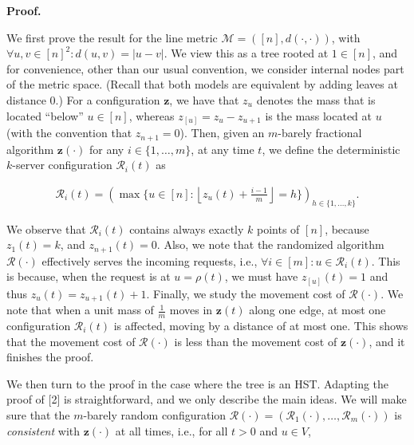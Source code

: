 



\par\medskip\noindent\textbf{Proof.}\par




We first prove the result for the line metric $\mathcal{M}=([n],d(\cdot,\cdot))$, with $\forall u,v\in[n]^{2}\colon d(u,v)=|u-v|$.
We view this as a tree rooted at $1\in[n]$, and for convenience, other than our usual convention, we consider internal nodes part of the metric space. (Recall that both models are equivalent by adding leaves at distance $0$.)
For a configuration ${\mathbf{z}}$, we have that $z_{u}$ denotes the mass that is located “below” $u\in[n]$, whereas $z_{[u]}=z_{u}-z_{u+1}$ is the mass located at $u$ (with the convention that $z_{n+1}=0$). Then, given an $m$-barely fractional algorithm ${\mathbf{z}}(\cdot)$ for any $i\in\{1,\dots,m\}$, at any time $t$, we define the deterministic $k$-server configuration $\mathcal{R}_{i}(t)$ as\par


\[\begin{gathered}
\mathcal{R}_{i}(t)=\left(\max\{u\in[n]\colon\left\lfloor z_{u}(t)+\frac{i-1}{m}\right\rfloor=h\}\right)_{h\in\{1,\dots,k\}}.
\end{gathered}\]


We observe that $\mathcal{R}_{i}(t)$ contains always exactly $k$ points of $[n]$, because $z_{1}(t)=k$, and $z_{n+1}(t)=0$. Also, we note that the randomized algorithm $\mathcal{R}(\cdot)$ effectively serves the incoming requests, i.e., $\forall i\in[m]\colon u\in\mathcal{R}_{i}(t)$. This is because, when the request is at $u=\rho(t)$, we must have $z_{[u]}(t)=1$ and thus $z_{u}(t)=z_{u+1}(t)+1$. Finally, we study the movement cost of $\mathcal{R}(\cdot)$. We note that when a unit mass of $\frac{1}{m}$ moves in ${\mathbf{z}}(t)$ along one edge, at most one configuration $\mathcal{R}_{i}(t)$ is affected, moving by a distance of at most one. This shows that the movement cost of $\mathcal{R}(\cdot)$ is less than the movement cost of ${\mathbf{z}}(\cdot)$, and it finishes the proof.\par




We then turn to the proof in the case where the tree is an HST. Adapting the proof of [2] is straightforward, and we only describe the main ideas. We will make sure that the $m$-barely random configuration $\mathcal{R}(\cdot)=(\mathcal{R}_{1}(\cdot),\dots,\mathcal{R}_{m}(\cdot))$ is \emph{consistent} with ${\mathbf{z}}(\cdot)$ at all times, i.e., for all $t>0$ and $u\in V$,\par


